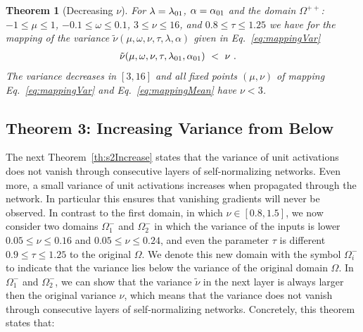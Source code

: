 \documentclass{article}
\newtheorem{theorem}{Theorem}
\newcommand\nunn{{\tilde \nu}}
\renewcommand{\leq}{\leqslant}
\begin{document}
\begin{theorem}[Decreasing $\nu$]
\label{th:s2Decrease}
For $\lambda=\lambda_{\rm 01}$, $\alpha=\alpha_{\rm 01}$ 
and the domain $\Omega^{++}$: 
$-1 \leq \mu \leq 1$, 
$-0.1 \leq \omega \leq 0.1$,
$3 \leq \nu \leq 16$, and 
$0.8 \leq \tau \leq 1.25$ we have for 
the mapping of the variance
$\nunn(\mu,\omega,\nu,\tau,\lambda, \alpha )$  given in Eq.~\eqref{eq:mappingVar}
\begin{align}
\nunn(\mu,\omega,\nu,\tau,\lambda_{\rm 01},\alpha_{\rm 01}) \ &< \ \nu \ .
\end{align}
The variance decreases in $[3,16]$ and all fixed
points $(\mu,\nu)$ of mapping Eq.~\eqref{eq:mappingVar} and Eq.~\eqref{eq:mappingMean} have $\nu<3$.
\end{theorem}



\subsection{Theorem 3: Increasing Variance from Below}
The next Theorem~\ref{th:s2Increase} states 
that the variance of unit activations 
does not vanish through
consecutive layers of self-normalizing networks.
Even more, a small variance of unit activations increases when
propagated through the network. 
In particular this ensures that vanishing gradients will never be
observed.
In contrast to the first domain, 
in which $\nu \in [0.8, 1.5]$, we now consider two domains $\Omega_1 ^-$ and
$\Omega_2 ^-$ in which the variance of the inputs is lower $0.05 \leq \nu \leq 0.16$ and $0.05 \leq \nu \leq 0.24$,
and even the parameter $\tau$ is different $0.9 \leq \tau \leq 1.25$ to the original $\Omega$. 
We denote this new domain with 
the symbol $\Omega^{-}_i$ to indicate that the variance lies below the variance of the original domain $\Omega$.
In $\Omega_1 ^-$ and $\Omega_2 ^-$, 
we can show that the variance $\nunn$ in the next layer is always larger 
then the original variance $\nu$, which means that the variance does not vanish through
consecutive layers of self-normalizing networks.
Concretely, this theorem states that: 
\end{document}
